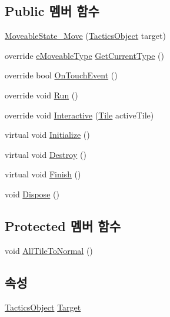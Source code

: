 \subsection*{Public 멤버 함수}
\begin{DoxyCompactItemize}
\item 
\hyperlink{class_move_decorator_1_1_moveable_state___move_a99f0c50b04a1bf2329d3cfed347f0e5a}{Moveable\+State\+\_\+\+Move} (\hyperlink{class_tactics_object}{Tactics\+Object} target)
\item 
override \hyperlink{_move_decorator_8cs_a90215797ba850e199f3ef63d7c56f132}{e\+Moveable\+Type} \hyperlink{class_move_decorator_1_1_moveable_state___move_a92389a089bde6eb88cf9b1467f7f4df5}{Get\+Current\+Type} ()
\item 
override bool \hyperlink{class_move_decorator_1_1_moveable_state___move_a341a523047c57aae78495154f0205b0c}{On\+Touch\+Event} ()
\item 
override void \hyperlink{class_move_decorator_1_1_moveable_state___move_ae1bb2c9ca5992373aa872788775d3e4a}{Run} ()
\item 
override void \hyperlink{class_move_decorator_1_1_moveable_state___move_a9e9c360898b9c25fcc478ef2db20f316}{Interactive} (\hyperlink{class_tile}{Tile} active\+Tile)
\item 
virtual void \hyperlink{class_m_c_n_1_1_state_a5be59bc891e64cbbe4322d74a6746908}{Initialize} ()
\item 
virtual void \hyperlink{class_m_c_n_1_1_state_aebf48ef248bbf185d6aae91d9789459e}{Destroy} ()
\item 
virtual void \hyperlink{class_m_c_n_1_1_state_a2492ca731678b8216c02134dddeeb745}{Finish} ()
\item 
void \hyperlink{class_m_c_n_1_1_state_af6df0477e0dead784489688cb2c2093e}{Dispose} ()
\end{DoxyCompactItemize}
\subsection*{Protected 멤버 함수}
\begin{DoxyCompactItemize}
\item 
void \hyperlink{class_move_decorator_1_1_moveable_state_a2b63f058084f2548f8547c21715d271c}{All\+Tile\+To\+Normal} ()
\end{DoxyCompactItemize}
\subsection*{속성}
\begin{DoxyCompactItemize}
\item 
\hyperlink{class_tactics_object}{Tactics\+Object} \hyperlink{class_m_c_n_1_1_state_a79a563b32f183c9adc9a96679fc57eb8}{Target}
\end{DoxyCompactItemize}


